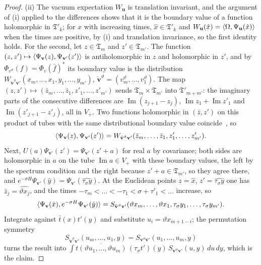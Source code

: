 \begin{proof}
(ii) The vacuum expectation $W_{\mathbf u}$ is translation invariant, and the
argument of (i) applied to the differences shows that it is the boundary
value of a function holomorphic in $\mathfrak T'_k$; for $x$ with increasing
times, $\hat x\in\mathfrak T'_k$ and $W_{\mathbf u}(\hat x)=\langle \Omega,\Psi_{\mathbf u}
(\hat x)\rangle$ when the times are positive, by (i) and translation invariance, so
the first identity holds. For the second, let $z\in\mathfrak T_m$ and $z'\in
\mathfrak T_{m'}$. The function $(z,z')\mapsto\langle \Psi_{\mathbf v}(z),
\Psi_{\mathbf v'}(z')\rangle$ is antiholomorphic in $z$ and holomorphic in $z'$, and
by $\Phi_{v^\vartheta}(f)=\Phi_v(\bar f)^*$ its boundary value is the
distribution $W_{\check{\mathbf v}^\vartheta\mathbf v'}(x_m,\dots,x_1,y_1,\dots,
y_{m'})$, $\check{\mathbf v}^\vartheta=(v_m^\vartheta,\dots,v_1^\vartheta)$. The
map $(z,z')\mapsto(\bar z_m,\dots,\bar z_1,z'_1,\dots,z'_{m'})$ sends
$\mathfrak T_m\times\mathfrak T_{m'}$ into $\mathfrak T'_{m+m'}$: the
imaginary parts of the consecutive differences are $\operatorname{Im}(z_{j+1}
-z_j)$, $\operatorname{Im}z_1+\operatorname{Im}z'_1$ and $\operatorname{Im}
(z'_{j+1}-z'_j)$, all in $V_+$. Two functions holomorphic in $(\bar z,z')$ on
this product of tubes with the same distributional boundary
value coincide~\cite[Ch.~2]{SW64}, so
\[
\langle \Psi_{\mathbf v}(z),\Psi_{\mathbf v'}(z')\rangle=W_{\check{\mathbf v}^\vartheta\mathbf v'}
(\bar z_m,\dots,\bar z_1,z'_1,\dots,z'_{m'}).
\]
Next, $U(a)\Psi_{\mathbf v'}(z')=\Psi_{\mathbf v'}(z'+a)$ for real $a$ by
covariance; both sides are holomorphic in $a$ on the tube
$\operatorname{Im}a\in V_+$ with these boundary values, the left by the
spectrum condition and the right because $z'+a\in\mathfrak T_{m'}$, so they
agree there, and $e^{-\sigma H}\Psi_{\mathbf v'}(\hat y)=\Psi_{\mathbf v'}
(\widehat{\tau_\sigma y})$. At the Euclidean points $z=\hat x$, $z'=
\widehat{\tau_\sigma y}$ one has $\bar z_j=\widehat{\vartheta x_j}$, and the
times $-\tau_m<\dots<-\tau_1<\sigma+\tau'_1<\dots$ increase, so
\[
\langle \Psi_{\mathbf v}(\hat x),e^{-\sigma H}\Psi_{\mathbf v'}(\hat y)\rangle
=S_{\check{\mathbf v}^\vartheta\mathbf v'}(\vartheta x_m,\dots,\vartheta x_1,
\tau_\sigma y_1,\dots,\tau_\sigma y_{m'}).
\]
Integrate against $\bar t(x)t'(y)$ and substitute $u_i=\vartheta x_{m+1-i}$;
the permutation symmetry
\[
S_{\check{\mathbf v}^\vartheta\mathbf v'}(u_m,\dots,u_1,y)=S_{\mathbf v^\vartheta
\mathbf v'}(u_1,\dots,u_m,y)
\]
turns the result into $\int\overline{t(\vartheta u_1,\dots,\vartheta u_m)}\,
(\tau_\sigma t')(y)\,S_{\mathbf v^\vartheta\mathbf v'}(u,y)\,du\,dy$, which is
the claim.


\end{proof}
